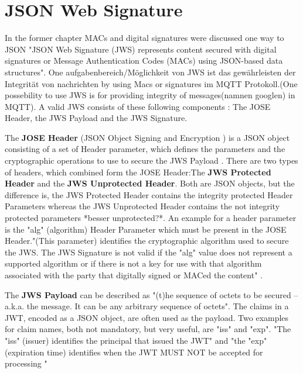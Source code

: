 \section{JSON Web Signature}

In the former chapter MACs and digital signatures were discussed one way to 
JSON
"JSON Web Signature (JWS) represents content secured with digital signatures or Message Authentication Codes (MACs) using JSON-based  data structures"\cite{rfc7515}.
One aufgabenbereich/Möglichkeit  von JWS ist das gewährleisten der Integrität von nachrichten by using Macs or signatures im MQTT Protokoll.(One possebility to use JWS is for providing integrity of messages(namnen googlen) in MQTT).
A valid JWS consists of these following components : The JOSE Header, the JWS Payload and the JWS Signature.\newline

The \textbf{JOSE Header} (JSON Object Signing and Encryption ) is a JSON object consisting of a set of Header parameter, which defines the parameters and the cryptographic operations to use to secure the JWS Payload \cite{rfc7515}. There are two types of headers, which combined form the JOSE Header:\newline The \textbf{JWS Protected Header} and the \textbf{JWS Unprotected Header}.\newline
Both are JSON objects, but the difference is, the JWS Protected Header contains the integrity protected Header Parameters whereas the JWS Unprotected Header contains the not integrity protected parameters *besser unprotected?*.\newline
An example for a header parameter is the "alg" (algorithm) Header Parameter which must be present in the JOSE Header."(This parameter) identifies the cryptographic algorithm used to secure the JWS. The JWS Signature is not valid if the "alg" value does not represent a supported algorithm or if there is not a key for use with that algorithm associated with the party that digitally signed or MACed the content" \cite{rfc7515}.\newline

The \textbf{JWS Payload} can be described as "(t)he sequence of octets to be secured -- a.k.a. the message. It can be any arbitrary sequence of octets"\cite{rfc7515}.\newline
The claims in a JWT, encoded as a JSON object, are often used as the payload. \cite{rfc7519}\newline
Two examples for claim names, both not mandatory, but very useful, are "iss" and "exp". "The "iss" (issuer) identifies the principal that issued the JWT" \cite{rfc7519} and "the "exp" (expiration time) identifies when the JWT MUST NOT be accepted for processing "\cite{rfc7519} \newline


